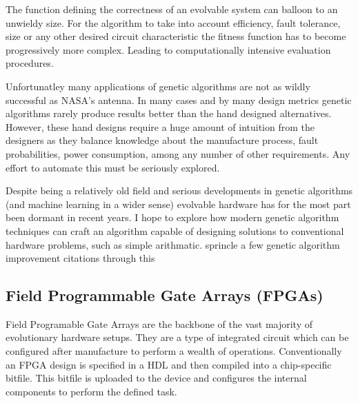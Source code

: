 The function defining the correctness of an evolvable system can balloon
to an unwieldy size. For the algorithm to take into account efficiency, fault tolerance, size
or any other desired circuit characteristic the fitness function has to
become progressively more complex. Leading to computationally intensive
evaluation procedures.

Unfortunatley many applications of genetic algorithms are not as wildly
successful as NASA's antenna.
In many cases and by many design metrics genetic algorithms rarely produce results
better than the hand designed alternatives. However, these hand designs require
a huge amount of intuition from the designers as they balance
knowledge about the manufacture process, fault probabilities, power
consumption, among any number of other requirements. Any effort to automate
this must be seriously explored.

Despite being a relatively old field and serious developments in genetic
algorithms (and machine learning in a wider sense) evolvable hardware has for
the most part been dormant in recent years. I hope to explore how modern
genetic algorithm techniques can craft an algorithm capable of designing solutions
to conventional hardware problems, such as simple arithmatic.
\todo sprincle a few genetic algorithm improvement citations through this

\subsection{Field Programmable Gate Arrays (FPGAs) \label{ss:FPGAs}}
Field Programable Gate Arrays are the backbone of the vast majority of evolutionary
hardware setups. They are a type of integrated circuit which can be
configured after manufacture to perform a wealth of operations. Conventionally
an FPGA design is specified in a HDL and then compiled into a chip-specific bitfile.
This bitfile is uploaded to the device and configures the internal components
to perform the defined task.

